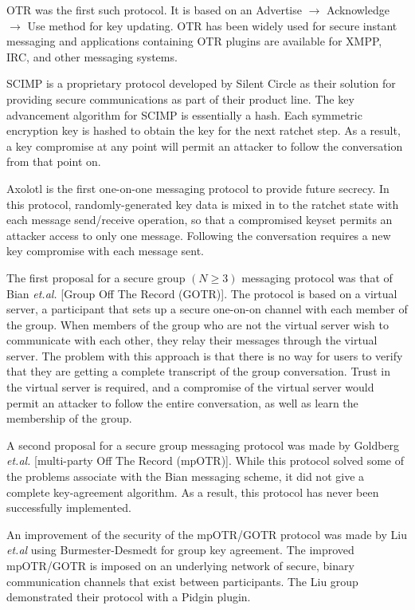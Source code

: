 \documentclass[%
preprint,
amsmath,amssymb,
aps,
prb,
floatfix,
]{revtex4-1}
\begin{document}
OTR was the first such protocol. It is based on an Advertise $\rightarrow$
Acknowledge $\rightarrow$ Use method for key updating. OTR has been widely used
for secure instant messaging and applications containing OTR plugins are
available for XMPP, IRC, and other messaging systems.

SCIMP is a proprietary protocol developed by Silent Circle as their solution for
providing secure communications as part of their product line. The key
advancement algorithm for SCIMP is essentially a hash. Each symmetric encryption
key is hashed to obtain the key for the next ratchet step. As a result, a key
compromise at any point will permit an attacker to follow the conversation from
that point on.

Axolotl is the first one-on-one messaging protocol to provide future secrecy. In
this protocol, randomly-generated key data is mixed in to the ratchet state with
each message send/receive operation, so that a compromised keyset permits an
attacker access to only one message. Following the conversation requires a new
key compromise with each message sent.

The first proposal for a secure group $(N \ge 3)$ messaging protocol was that of
Bian \textit{et.al.}\cite{ref:bian} [Group Off The Record (GOTR)].
The protocol is based on a virtual server,
a participant that sets up a secure one-on-on channel with each member of the group.
When members of the group who are not the virtual server wish to communicate
with each other, they relay their messages through the virtual server. The
problem with this approach is that there is no way for users to verify that they
are getting a complete transcript of the group conversation. Trust in the
virtual server is required, and a compromise of the virtual server would permit
an attacker to follow the entire conversation, as well as learn the membership
of the group.

A second proposal for a secure group messaging protocol was made by Goldberg
\textit{et.al.}\cite{ref:goldberg} [multi-party Off The Record (mpOTR)].
While this protocol solved some of the
problems associate with the Bian messaging scheme, it did not give a complete
key-agreement algorithm. As a result, this protocol has never been successfully
implemented.

An improvement of the security of the mpOTR/GOTR protocol was made by Liu
\textit{et.al}\cite{ref:liu} using Burmester-Desmedt\cite{ref:burmester}
for group key agreement. The improved mpOTR/GOTR is imposed on an
underlying network of secure, binary communication channels that exist between
participants.
The Liu group demonstrated their protocol with a Pidgin\cite{ref:pidgin} plugin.
\end{document}
